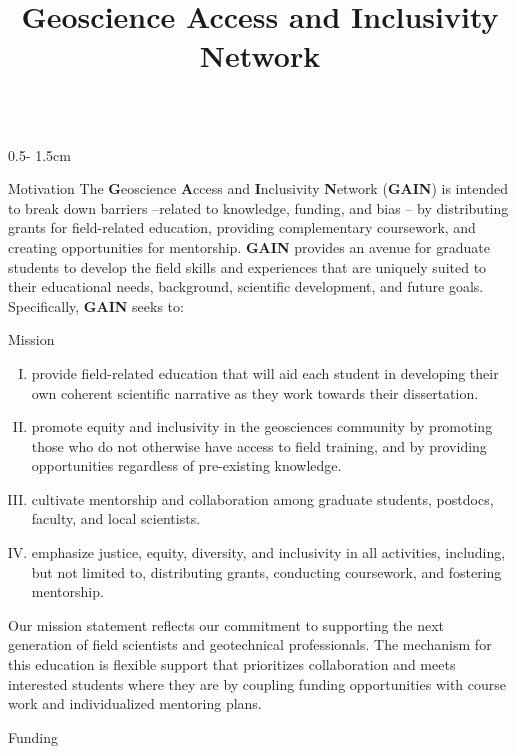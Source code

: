 \documentclass{uwposter}
\title{Geoscience Access and Inclusivity Network}
\begin{document}
\begin{frame}
\begin{columns}[onlytextwidth]


\begin{column}{0.5\textwidth - 1.5cm}
    \begin{block}{Motivation}
       The \textbf{\alert{G}}eoscience \textbf{\alert{A}}ccess and \textbf{\alert{I}}nclusivity \textbf{\alert{N}}etwork (\textbf{\alert{GAIN}}) is intended to break down barriers –related to knowledge, funding, and bias – by distributing grants for field-related education, providing complementary coursework, and creating opportunities for mentorship.
   	\textbf{\alert{GAIN}} provides an avenue for graduate students to develop the field skills and experiences that are uniquely suited to their educational needs, background, scientific development, and future goals.
	Specifically, \textbf{\alert{GAIN}} seeks to:
    \end{block}

    \begin{block}{Mission}
         \begin{enumerate}[I.]
         \item
    	provide field-related education that will aid each student in developing their own coherent scientific narrative as they work towards their dissertation.
    	\item
	promote equity and inclusivity in the geosciences community by promoting those who do not otherwise have access to field training, and by providing opportunities regardless of pre-existing knowledge.
    	\item
	cultivate mentorship and collaboration among graduate students, postdocs, faculty, and local scientists.
    	\item
	emphasize justice, equity, diversity, and inclusivity in all activities, including, but not limited to, distributing grants, conducting coursework, and fostering mentorship.
	\end{enumerate}
	Our mission statement reflects our commitment to supporting the next generation of field scientists and geotechnical professionals.
        The mechanism for this education is flexible support that prioritizes collaboration and meets interested students where they are by coupling funding opportunities with course work and individualized mentoring plans.

    \end{block}

    \begin{block}{Funding}
      

\end{block}
\end{column}
\end{columns}
\end{frame}
\end{document}
